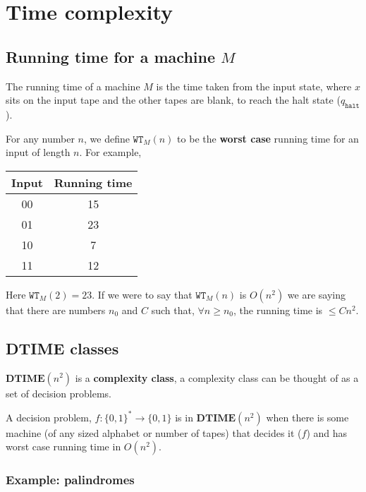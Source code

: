\documentclass{article}
\begin{document}
\section{Time complexity}

\subsection{Running time for a machine $M$}

The running time of a machine $M$ is the time taken from the input state, where $x$ sits on the input tape and the other tapes are blank, to reach the halt state ($q_{\texttt{halt} }$).

For any number $n$, we define $\texttt{WT}_{M}(n) $ to be the \textbf{worst case} running time for an input of length $n$.
For example,

\begin{center}
 \begin{tabular}{|c|c|}
 \hline
 Input & Running time\\ [0.5ex]
 \hline\hline
 00 & 15 \\
 \hline
 01 & 23 \\
 \hline
 10 & 7 \\
 \hline
 11 & 12\\
 \hline
\end{tabular}
\end{center}

Here $\texttt{WT} _{M}(2) = 23$. If we were to say that $\texttt{WT} _{M}(n)$ is $O(n^{2})$ we are saying that there are numbers $n_{0}$ and $C$ such that, $\forall n \geq n_{0}$, the running time is $\leq Cn^{2}$.

\subsection{\textbf{DTIME} classes }

$\mathbf{DTIME}(n^{2})$ is a \textbf{complexity class}, a complexity class can be thought of as a set of decision problems.

A decision problem, $f : \{ 0,1 \}^{*} \rightarrow \{ 0,1 \}  $ is in $\mathbf{DTIME}(n^{2}) $ when there is some machine (of any sized alphabet or number of tapes) that decides it ($f$) and has worst case running time in $O(n^{2})$.

\subsubsection{Example: palindromes}
\end{document}
